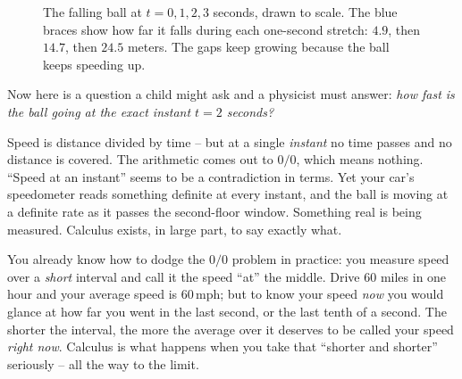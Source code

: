 \begin{figure}[htbp]
\centering
{}
\caption{The falling ball at $t=0,1,2,3$ seconds, drawn to scale. The blue braces show how far it falls during each one-second stretch: $4.9$, then $14.7$, then $24.5$ meters. The gaps keep growing because the ball keeps speeding up.}
\label{ch01:fig-falling-ball}
\end{figure}
Now here is a question a child might ask and a physicist must answer: \emph{how
fast is the ball going at the exact instant $t = 2$ seconds?}

Speed is distance divided by time -- but at a
single \emph{instant} no time passes and no distance is covered. The
arithmetic comes out to $0/0$, which means nothing. ``Speed at an instant'' seems to be a
contradiction in terms. Yet your car's speedometer reads something definite at
every instant, and the ball is moving at a definite rate as it passes the
second-floor window. Something real is being measured. Calculus exists, in
large part, to say exactly what.

\begin{intuitionbox}
You already know how to dodge the $0/0$ problem in practice: you measure speed
over a \emph{short} interval and call it the speed ``at'' the middle. Drive $60$
miles in one hour and your average speed is $60$\,mph; but to know your speed
\emph{now} you would glance at how far you went in the last second, or the last
tenth of a second. The shorter the interval, the more the average over it
deserves to be called your speed \emph{right now}. Calculus is what happens when
you take that ``shorter and shorter'' seriously -- all the way to the limit.
\end{intuitionbox}

